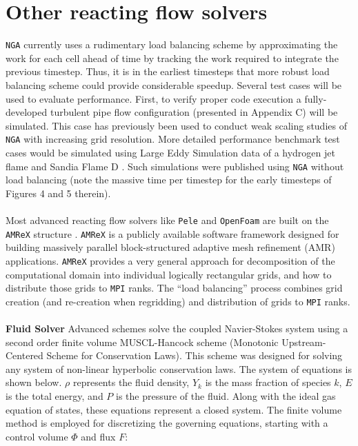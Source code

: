 \documentclass{homework}
\begin{document}
\section{\textbf{Other reacting flow solvers}}
\noindent \texttt{NGA} currently uses a rudimentary load balancing scheme by approximating the work for each cell ahead of time by tracking the work required to integrate the previous timestep. Thus, it is in the earliest timesteps that more robust load balancing scheme could provide considerable speedup. Several test cases will be used to evaluate performance. First, to verify proper code execution a fully-developed turbulent pipe flow configuration (presented in Appendix C) will be simulated. This case has previously been used to conduct weak scaling studies of \texttt{NGA} with increasing grid resolution. More detailed performance benchmark test cases would be simulated using Large Eddy Simulation data of a hydrogen jet flame \cite{TNF,BARLOW1994,BARLOW1996} and Sandia Flame D \cite{BARLOW1998}. Such simulations were published\cite{LACEY2021} using \texttt{NGA} without load balancing (note the massive time per timestep for the early timesteps of Figures 4 and 5 therein).
\\ \\ \noindent
Most advanced reacting flow solvers like \texttt{Pele} \cite{PeleC,PeleMP} and \texttt{OpenFoam} \cite{DLBFoam_1,DLBFoam_2} are built on the \texttt{AMReX} structure \cite{AMReX}. \texttt{AMReX} is a publicly available software framework designed for building massively parallel block-structured adaptive mesh refinement (AMR) applications. \texttt{AMReX} provides a very general approach for decomposition of the computational domain into individual logically rectangular grids, and how to distribute those grids to \texttt{MPI} ranks. The ``load balancing'' process combines grid creation (and re-creation when regridding) and distribution of grids to \texttt{MPI} ranks.
\\ \\ \noindent
\noindent \textbf{Fluid Solver} Advanced schemes solve the coupled Navier-Stokes system using a second order finite volume MUSCL-Hancock scheme (Monotonic Upstream-Centered Scheme for Conservation Laws). This scheme was designed for solving any system of non-linear hyperbolic conservation laws. The system of equations is shown below. $\rho$ represents the fluid density, $Y_k$ is the mass fraction of species $k$, $E$ is the total energy, and $P$ is the pressure of the fluid. Along with the ideal gas equation of states, these equations represent a closed system. The finite volume method is employed for discretizing the governing equations, starting with a control volume $\Phi$ and flux $F$:
\end{document}
